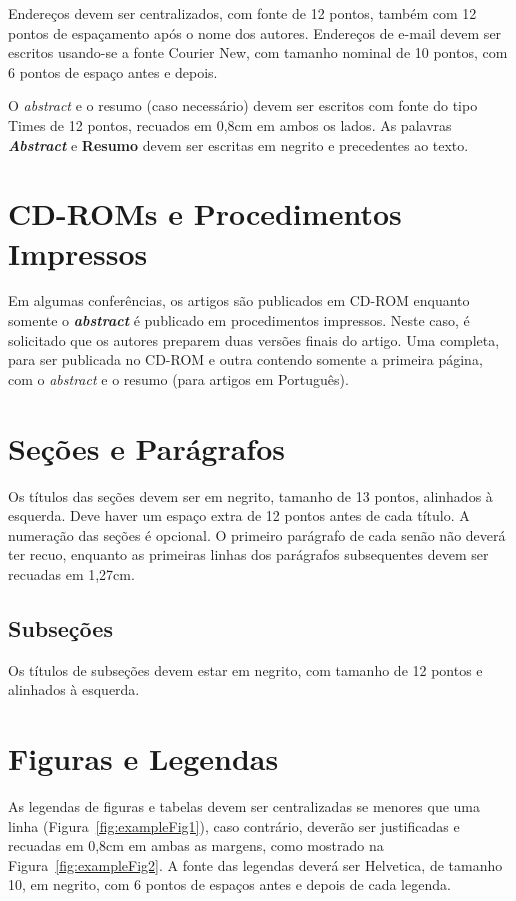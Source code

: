 \documentclass[12pt]{article}
\begin{document}
Endereços devem ser centralizados, com fonte de 12 pontos, também com 12 pontos de espaçamento após o nome dos autores. Endereços de e-mail devem ser escritos usando-se a fonte Courier New, com tamanho nominal de 10 pontos, com 6 pontos de espaço antes e depois.

O \emph{abstract} e o resumo (caso necessário) devem ser escritos com fonte do tipo Times de 12 pontos, recuados em 0,8cm em ambos os lados. As palavras \emph{\textbf{Abstract}} e \textbf{Resumo} devem ser escritas em negrito e precedentes ao texto.

\section{CD-ROMs e Procedimentos Impressos}

Em algumas conferências, os artigos são publicados em CD-ROM enquanto somente o \emph{\textbf{abstract}} é publicado em procedimentos impressos. Neste caso, é solicitado que os autores preparem duas versões finais do artigo. Uma completa, para ser publicada no CD-ROM e outra contendo somente a primeira página, com o \emph{abstract} e o resumo (para artigos em Português).


\section{Seções e Parágrafos}

Os títulos das seções devem ser em negrito, tamanho de 13 pontos, alinhados à esquerda. Deve haver um espaço extra de 12 pontos antes de cada título. A numeração das seções é opcional. O primeiro parágrafo de cada senão não deverá ter recuo, enquanto as primeiras linhas dos parágrafos subsequentes devem ser recuadas em 1,27cm. 


\subsection{Subseções}

Os títulos de subseções devem estar em negrito, com tamanho de 12 pontos e alinhados à esquerda.

\section{Figuras e Legendas}\label{sec:figs}

As legendas de figuras e tabelas devem ser centralizadas se menores que uma linha (Figura~\ref{fig:exampleFig1}), caso contrário, deverão ser justificadas e recuadas em 0,8cm em ambas as margens, como mostrado na Figura~\ref{fig:exampleFig2}. A fonte das legendas deverá ser Helvetica, de tamanho 10, em negrito, com 6 pontos de espaços antes e depois de cada legenda.
\end{document}
